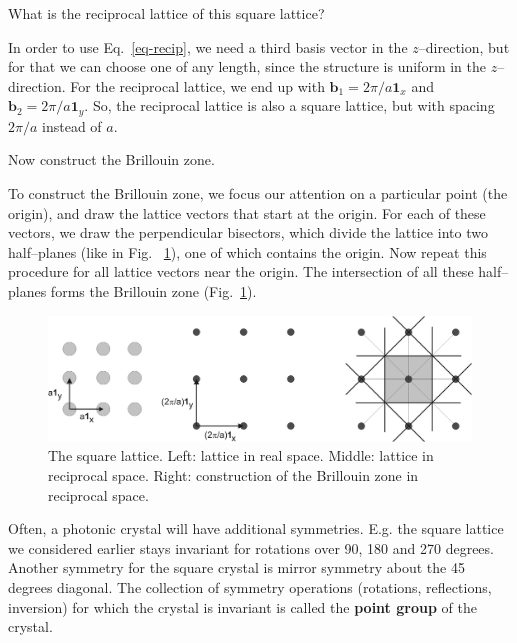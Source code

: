 \begin{cue}
  What is the reciprocal lattice of this square lattice?
\end{cue}

In order to use Eq.~\ref{eq-recip}, we need a third basis vector in the $z$--direction, but for that we can choose one of any length, since the structure is uniform in the $z$--direction. For the reciprocal lattice, we end up with  ${\mathbf b}_1 = 2 \pi / a {\mathbf 1}_x$ and ${\mathbf b}_2 = 2 \pi / a {\mathbf 1}_y$. So, the reciprocal lattice is also a square lattice, but with spacing $2 \pi / a$ instead of $a$.

\begin{cue}
Now construct the Brillouin zone.
\end{cue}

To construct the Brillouin zone, we focus our attention on a particular point (the origin), and draw the lattice vectors that start at the origin. For each of these vectors, we draw the perpendicular bisectors, which divide the lattice into two half--planes (like in Fig.~ \ref{fig-bril-square}), one of which contains the origin. Now repeat this procedure for all lattice vectors near the origin. \noindent{} The intersection of all these half--planes forms the Brillouin zone (Fig.~\ref{fig-bril-square}).

\begin{figure}
\centering
\includegraphics{symmetry/figures/brillouin_square}
\caption{The square lattice. Left: lattice in real space. Middle: lattice in reciprocal space. Right: construction of the Brillouin zone in reciprocal space.}
\label{fig-bril-square}
\end{figure}

\pagebreak
 

Often, a photonic crystal will have additional symmetries. E.g. the square lattice we considered earlier stays invariant for rotations over 90, 180 and 270 degrees. Another symmetry for the square crystal is mirror symmetry about the 45 degrees diagonal. The collection of symmetry operations (rotations, reflections, inversion) for which the crystal is invariant is called the \textbf{point group} of the crystal.

